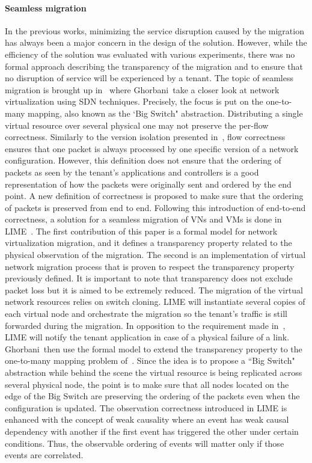 \paragraph{Seamless migration}
In the previous works, minimizing the service disruption caused by the migration has always been a major concern in the design of the solution. However, while the efficiency of the solution was evaluated with various experiments, there was no formal approach describing the transparency of the migration and to ensure that no disruption of service will be experienced by a tenant.
The topic of seamless migration is brought up in~\cite{toward-Ghorbani2014} where Ghorbani~\etal take a closer look at network virtualization using SDN techniques.
Precisely, the focus is put on the one-to-many mapping, also known as the `Big Switch" abstraction.
Distributing a single virtual resource over several physical one may not preserve the per-flow correctness.
Similarly to the version isolation presented in~\cite{Liu2015a}, flow correctness ensures that one packet is always processed by one specific version of a network configuration.
However, this definition does not ensure that the ordering of packets as seen by the tenant's applications and controllers is a good representation of how the packets were originally sent and ordered by the end point.
A new definition of correctness is proposed to make sure that the ordering of packets is preserved from end to end.
Following this introduction of end-to-end correctness, a solution for a seamless migration of VNs and VMs is done in LIME~\cite{Lime-Ghorbani2014}.
The first contribution of this paper is a formal model for network virtualization migration, and it defines a transparency property related to the physical observation of the migration.
The second is an implementation of virtual network migration process that is proven to respect the transparency property previously defined.
It is important to note that transparency does not exclude packet loss but it is aimed to be extremely reduced.
The migration of the virtual network resources relies on switch cloning.
LIME will instantiate several copies of each virtual node and orchestrate the migration so the tenant's traffic is still forwarded during the migration.
In opposition to the requirement made in~\cite{Ko2017c}, LIME will notify the tenant application in case of a physical failure of a link.
Ghorbani~\etal then use the formal model to extend the transparency property to the one-to-many mapping problem of~\cite{toward-Ghorbani2014}.
Since the idea is to propose a ``Big Switch" abstraction while behind the scene the virtual resource is being replicated across several physical node, the point is to make sure that all nodes located on the edge of the Big Switch are preserving the ordering of the packets even when the configuration is updated.
The observation correctness introduced in LIME is enhanced with the concept of weak causality where an event has weak causal dependency with another if the first event has triggered the other under certain conditions.
Thus, the observable ordering of events will matter only if those events are correlated.

